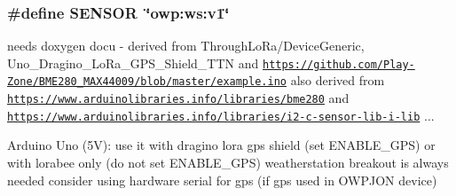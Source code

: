 \hypertarget{OWP__DG__GPS__WeatherStation_8ino_a84f1ead330bbcc83a63929c4726080d7}{
\subsubsection[{S\-E\-N\-S\-O\-R}]{\setlength{\rightskip}{0pt plus 5cm}\#define S\-E\-N\-S\-O\-R~\char`\"{}owp\-:ws\-:v1\char`\"{}}}\label{OWP__DG__GPS__WeatherStation_8ino_a84f1ead330bbcc83a63929c4726080d7}
needs doxygen docu -\/ derived from Through\-Lo\-Ra/\-Device\-Generic, Uno\-\_\-\-Dragino\-\_\-\-Lo\-Ra\-\_\-\-G\-P\-S\-\_\-\-Shield\-\_\-\-T\-T\-N and \href{https://github.com/Play-Zone/BME280_MAX44009/blob/master/example.ino}{\tt https\-://github.\-com/\-Play-\/\-Zone/\-B\-M\-E280\-\_\-\-M\-A\-X44009/blob/master/example.\-ino} also derived from \href{https://www.arduinolibraries.info/libraries/bme280}{\tt https\-://www.\-arduinolibraries.\-info/libraries/bme280} and \href{https://www.arduinolibraries.info/libraries/i2-c-sensor-lib-i-lib}{\tt https\-://www.\-arduinolibraries.\-info/libraries/i2-\/c-\/sensor-\/lib-\/i-\/lib} ...

Arduino Uno (5\-V)\-: use it with dragino lora gps shield (set E\-N\-A\-B\-L\-E\-\_\-\-G\-P\-S) or with lorabee only (do not set E\-N\-A\-B\-L\-E\-\_\-\-G\-P\-S) weatherstation breakout is always needed consider using hardware serial for gps (if gps used in O\-W\-P\-J\-O\-N device)

